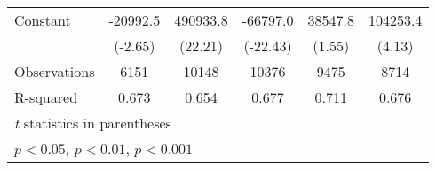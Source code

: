 {\begin{tabular}{l*{5}{c}}
Constant            &    -20992.5\sym{**} &    490933.8\sym{***}&    -66797.0\sym{***}&     38547.8         &    104253.4\sym{***}\\
                    &     (-2.65)         &     (22.21)         &    (-22.43)         &      (1.55)         &      (4.13)         \\
\hline
Observations        &        6151         &       10148         &       10376         &        9475         &        8714         \\
R-squared           &       0.673         &       0.654         &       0.677         &       0.711         &       0.676         \\
\hline\hline
\multicolumn{6}{l}{\footnotesize \textit{t} statistics in parentheses}\\
\multicolumn{6}{l}{\footnotesize \sym{*} \(p<0.05\), \sym{**} \(p<0.01\), \sym{***} \(p<0.001\)}\\
\end{tabular}
}
